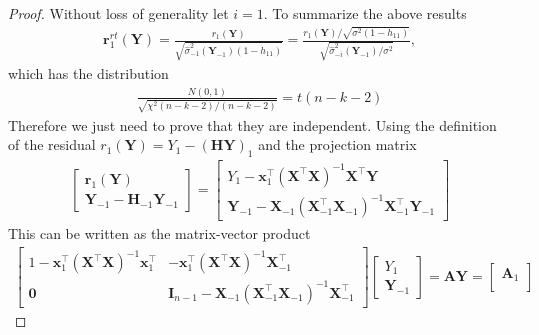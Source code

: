 \begin{proof}
    Without loss of generality let $i=1$. 
    To summarize the above results
    \begin{align*}
        \textbf{r}_1^{rt}(\textbf{Y}) = \frac{r_1(\textbf{Y})}{\sqrt{\hat{\sigma}^2_{-1}(\textbf{Y}_{-1})(1-h_{11})}}
        =
        \frac{r_1(\textbf{Y})/ \sqrt{\sigma^2 (1-h_{11})}}{\sqrt{\hat{\sigma}_{-i}^2 (\textbf{Y}_{-1})/\sigma^2}},
    \end{align*}
    which has the distribution
    \begin{align*}
        \frac{N(0,1)}{\sqrt{\chi^2(n-k-2)/(n-k-2)}} = t(n-k-2)
    \end{align*}
    Therefore we just need to prove that they are independent.
    Using the definition of the residual $r_1(\textbf{Y}) = Y_1 -  (\textbf{HY})_1$ and the projection matrix
    \begin{align*}
        \begin{bmatrix}
            \textbf{r}_1(\textbf{Y}) \\
            \textbf{Y}_{-1} - \textbf{H}_{-1} \textbf{Y}_{-1}
        \end{bmatrix}
        =
        \begin{bmatrix}
            Y_1 - \textbf{x}_1^\top (\textbf{X}^\top \textbf{X})^{-1} \textbf{X}^\top \textbf{Y} \\
            \textbf{Y}_{-1} - \textbf{X}_{-1} (\textbf{X}_{-1}^\top \textbf{X}_{-1})^{-1} \textbf{X}_{-1}^\top \textbf{Y}_{-1}
        \end{bmatrix}
    \end{align*}
    This can be written as the matrix-vector product
    \begin{align*}
        \begin{bmatrix}
            1 - \textbf{x}_1^\top (\textbf{X}^\top \textbf{X})^{-1} \textbf{x}_1^\top & - \textbf{x}_1^\top (\textbf{X}^\top \textbf{X})^{-1} \textbf{X}_{-1}^\top \\
            \textbf{0} & \textbf{I}_{n-1} - \textbf{X}_{-1} (\textbf{X}_{-1}^\top \textbf{X}_{-1})^{-1} \textbf{X}_{-1}^\top
        \end{bmatrix}
        \begin{bmatrix}
            Y_1 \\
            \textbf{Y}_{-1}
        \end{bmatrix}
        =
        \textbf{AY} =
                \begin{bmatrix}
            \textbf{A}_1 \\

\end{bmatrix}
\end{align*}
\end{proof}
